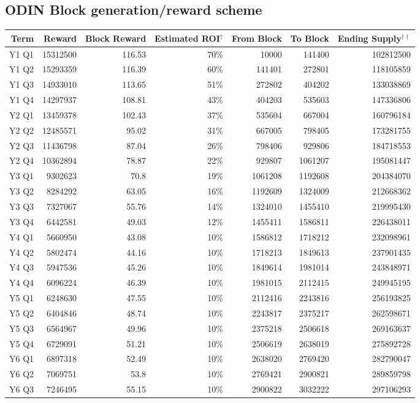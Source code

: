 \documentclass[12pt,letterpaper]{article}
\begin{document}
\subsection{ODIN Block generation/reward scheme}
\renewcommand{\arraystretch}{1.2}
\begin{center}
\begin{adjustbox}{max width=\textwidth}
\begin{threeparttable}
\begin{tabular}{|rrrrrrr|}
\hline 
Term & Reward & Block Reward & Estimated ROI$^\dag$ & From Block & To Block & Ending Supply$^{\dag\dag}$\tabularnewline
\hline 
\hline
Y1 Q1 & 15312500 & 116.53 & 70\% & 10000 & 141400 & 102812500\tabularnewline
\hline
Y1 Q2 & 15293359 & 116.39 & 60\% & 141401 & 272801 & 118105859\tabularnewline
\hline
Y1 Q3 & 14933010 & 113.65 & 51\% & 272802 & 404202 & 133038869\tabularnewline
\hline
Y1 Q4 & 14297937 & 108.81 & 43\% & 404203 & 535603 & 147336806\tabularnewline
\hline
Y2 Q1 & 13459378 & 102.43 & 37\% & 535604 & 667004 & 160796184\tabularnewline
\hline
Y2 Q2 & 12485571 & 95.02 & 31\% & 667005 & 798405 & 173281755\tabularnewline
\hline
Y2 Q3 & 11436798 & 87.04 & 26\% & 798406 & 929806 & 184718553\tabularnewline
\hline
Y2 Q4 & 10362894 & 78.87 & 22\% & 929807 & 1061207 & 195081447\tabularnewline
\hline
Y3 Q1 & 9302623 & 70.8 & 19\% & 1061208 & 1192608 & 204384070\tabularnewline
\hline
Y3 Q2 & 8284292 & 63.05 & 16\% & 1192609 & 1324009 & 212668362\tabularnewline
\hline
Y3 Q3 & 7327067 & 55.76 & 14\% & 1324010 & 1455410 & 219995430\tabularnewline
\hline
Y3 Q4 & 6442581 & 49.03 & 12\% & 1455411 & 1586811 & 226438011\tabularnewline
\hline
Y4 Q1 & 5660950 & 43.08 & 10\% & 1586812 & 1718212 & 232098961\tabularnewline
\hline
Y4 Q2 & 5802474 & 44.16 & 10\% & 1718213 & 1849613 & 237901435\tabularnewline
\hline
Y4 Q3 & 5947536 & 45.26 & 10\% & 1849614 & 1981014 & 243848971\tabularnewline
\hline
Y4 Q4 & 6096224 & 46.39 & 10\% & 1981015 & 2112415 & 249945195\tabularnewline
\hline
Y5 Q1 & 6248630 & 47.55 & 10\% & 2112416 & 2243816 & 256193825\tabularnewline
\hline
Y5 Q2 & 6404846 & 48.74 & 10\% & 2243817 & 2375217 & 262598671\tabularnewline
\hline
Y5 Q3 & 6564967 & 49.96 & 10\% & 2375218 & 2506618 & 269163637\tabularnewline
\hline
Y5 Q4 & 6729091 & 51.21 & 10\% & 2506619 & 2638019 & 275892728\tabularnewline
\hline
Y6 Q1 & 6897318 & 52.49 & 10\% & 2638020 & 2769420 & 282790047\tabularnewline
\hline
Y6 Q2 & 7069751 & 53.8 & 10\% & 2769421 & 2900821 & 289859798\tabularnewline
\hline
Y6 Q3 & 7246495 & 55.15 & 10\% & 2900822 & 3032222 & 297106293\tabularnewline
\hline

\end{tabular}
\end{threeparttable}
\end{adjustbox}
\end{center}
\end{document}
